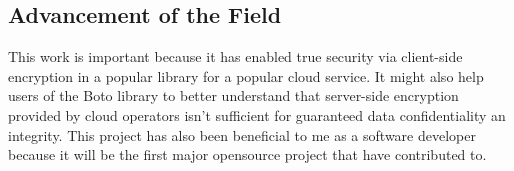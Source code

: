 \subsection{Advancement of the Field}
This work is important because it has enabled true security via client-side encryption in a popular library for a popular cloud service.
It might also help users of the Boto library to better understand that server-side encryption provided by cloud operators isn't sufficient for guaranteed data confidentiality an integrity.
This project has also been beneficial to me as a software developer because it will be the first major opensource project that have contributed to.

